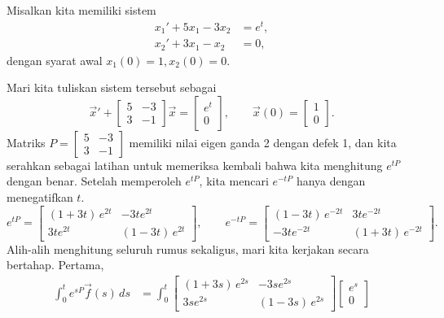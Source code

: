 \begin{example}
Misalkan kita memiliki sistem
\begin{align*}
x_1' + 5x_1 - 3x_2 &= e^t , \\
x_2' + 3x_1 - x_2 &= 0 ,
\end{align*}
dengan syarat awal $x_1(0) = 1, x_2(0) = 0$.

Mari kita tuliskan sistem tersebut sebagai
\begin{equation*}
{\vec{x}}' +
\begin{bmatrix} 5 & -3 \\ 3 & -1 \end{bmatrix}
\vec{x} =
\begin{bmatrix} e^t \\ 0 \end{bmatrix} ,
\qquad
\vec{x}(0) = 
\begin{bmatrix} 1 \\ 0 \end{bmatrix} .
\end{equation*}
Matriks
$P = \left[
\begin{smallmatrix} 5 & -3 \\ 3 & -1 \end{smallmatrix} \right]$
memiliki nilai eigen ganda 2 dengan defek 1, dan kita serahkan sebagai latihan
untuk memeriksa kembali bahwa kita menghitung $e^{tP}$ dengan benar.  Setelah memperoleh
$e^{tP}$, kita mencari $e^{-tP}$ hanya dengan menegatifkan $t$.
\begin{equation*}
e^{tP} = 
\begin{bmatrix}
(1+3t)\,e^{2t} & -3te^{2t} \\
3te^{2t} & (1-3t)\,e^{2t}
\end{bmatrix}
, \qquad
e^{-tP} = 
\begin{bmatrix}
(1-3t)\,e^{-2t} & 3te^{-2t} \\
-3te^{-2t} & (1+3t)\,e^{-2t}
\end{bmatrix}
.
\end{equation*}
Alih-alih menghitung seluruh rumus sekaligus, mari kita kerjakan secara bertahap.
Pertama,
\begin{equation*}
\begin{split}
\int_0^t e^{sP}\vec{f}(s) \, ds & = 
\int_0^t
 \begin{bmatrix}
 (1+3s)\,e^{2s} & -3se^{2s} \\
 3se^{2s} & (1-3s)\,e^{2s}
 \end{bmatrix}
 \begin{bmatrix} e^{s} \\ 0 \end{bmatrix}

\end{split}
\end{equation*}
\end{example}
